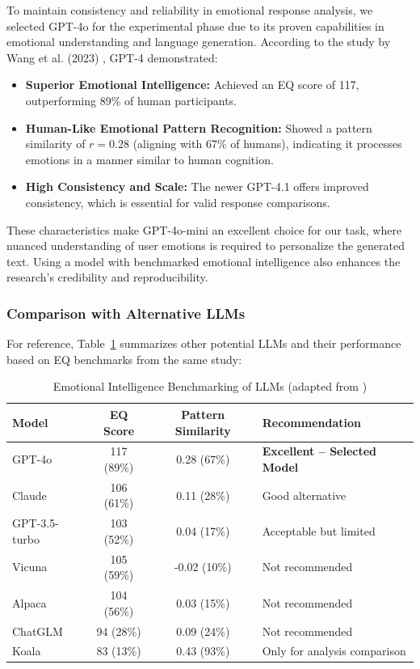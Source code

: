 \par To maintain consistency and reliability in emotional response analysis, we selected GPT-4o for the experimental phase due to its proven capabilities in emotional understanding and language generation. According to the study by Wang et al. (2023) \cite{wang2023emotional}, GPT-4 demonstrated:
\begin{itemize}
    \item \textbf{Superior Emotional Intelligence:} Achieved an EQ score of 117, outperforming 89\% of human participants.
    \item \textbf{Human-Like Emotional Pattern Recognition:} Showed a pattern similarity of $r = 0.28$ (aligning with 67\% of humans), indicating it processes emotions in a manner similar to human cognition.
    \item \textbf{High Consistency and Scale:} The newer GPT-4.1 offers improved consistency, which is essential for valid response comparisons.
\end{itemize}

\par These characteristics make GPT-4o-mini an excellent choice for our task, where nuanced understanding of user emotions is required to personalize the generated text. Using a model with benchmarked emotional intelligence also enhances the research's credibility and reproducibility.

\subsubsection*{Comparison with Alternative LLMs}

\par For reference, Table~\ref{tab:llm_comparison} summarizes other potential LLMs and their performance based on EQ benchmarks from the same study:

\begin{table}[H]
\centering
\begin{tabular}{|l|c|c|l|}
\hline
\textbf{Model} & \textbf{EQ Score} & \textbf{Pattern Similarity} & \textbf{Recommendation} \\
\hline
GPT-4o & 117 (89\%) & 0.28 (67\%) & \textbf{Excellent – Selected Model} \\
Claude & 106 (61\%) & 0.11 (28\%) & Good alternative \\
GPT-3.5-turbo & 103 (52\%) & 0.04 (17\%) & Acceptable but limited \\
Vicuna & 105 (59\%) & -0.02 (10\%) & Not recommended \\
Alpaca & 104 (56\%) & 0.03 (15\%) & Not recommended \\
ChatGLM & 94 (28\%) & 0.09 (24\%) & Not recommended \\
Koala & 83 (13\%) & 0.43 (93\%) & Only for analysis comparison \\
\hline
\end{tabular}
\caption{Emotional Intelligence Benchmarking of LLMs (adapted from \cite{wang2023emotional})}
\label{tab:llm_comparison}
\end{table}

